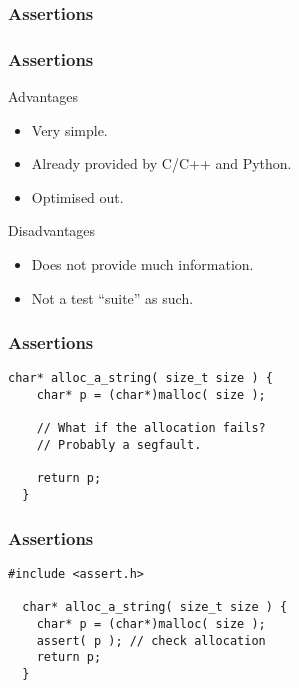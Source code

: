 \begin{frame}
  \frametitle{Assertions}
\end{frame}

\begin{frame}
  \frametitle{Assertions}
  \begin{block}{Advantages}
    \begin{itemize}
    \item Very simple.
    \item Already provided by C/C++ and Python.
    \item Optimised out.
    \end{itemize}
  \end{block}
  \begin{block}{Disadvantages}
    \begin{itemize}
    \item Does not provide much information.
    \item Not a test ``suite'' as such.
    \end{itemize}
  \end{block}
\end{frame}

\begin{frame}[fragile]
  \frametitle{Assertions}
  \begin{example}
    \begin{lstlisting}[style=C]
  char* alloc_a_string( size_t size ) {
    char* p = (char*)malloc( size );

    // What if the allocation fails?
    // Probably a segfault.

    return p;
  }
    \end{lstlisting}
  \end{example}
\end{frame}

\begin{frame}[fragile]
  \frametitle{Assertions}
  \begin{example}
    \begin{lstlisting}[style=C]
  #include <assert.h>

  char* alloc_a_string( size_t size ) {
    char* p = (char*)malloc( size );
    assert( p ); // check allocation
    return p;
  }
    \end{lstlisting}
  \end{example}
\end{frame}

